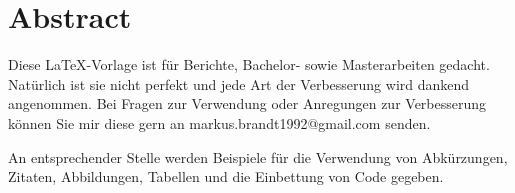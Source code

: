 \chapter*{Abstract}

Diese \LaTeX-Vorlage ist für Berichte, Bachelor- sowie Masterarbeiten gedacht. Natürlich ist sie nicht perfekt und jede Art der Verbesserung wird dankend angenommen. Bei Fragen zur Verwendung oder Anregungen zur Verbesserung können Sie mir diese gern an markus.brandt1992@gmail.com senden.

An entsprechender Stelle werden Beispiele für die Verwendung von Abkürzungen, Zitaten, Abbildungen, Tabellen und die Einbettung von Code gegeben.

